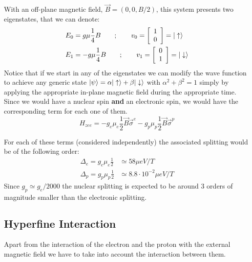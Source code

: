 With an off-plane magnetic field, $\vec{B}=(0,0,B/2)$, this system presents two eigenstates, that we can denote:
\begin{equation}
  \begin{split}
    E_0 &= g\mu\frac{1}{4}B \quad\quad;\quad\quad
    v_0 = \left[\begin{array}{c}
    1\\
    0
    \end{array}\right] = |\uparrow\rangle\\
    E_1 &= -g\mu\frac{1}{4}B \quad\quad;\quad\quad
    v_1 = \left[\begin{array}{c}
    0\\
    1
  \end{array}\right] = |\downarrow\rangle
  \end{split}
\end{equation}
Notice that if we start in any of the eigenstates we can modify the wave function to achieve any generic state $|\psi\rangle = \alpha|\uparrow\rangle+\beta|\downarrow\rangle$ with $\alpha^2+\beta^2 = 1$ simply by applying the appropriate in-plane magnetic field during the appropriate time.\\


Since we would have a nuclear spin \textbf{and} an electronic spin, we would have the corresponding term for each one of them.
\begin{equation}
  H_{zee} = -g_e\mu_e\frac{1}{2}\vec{B}\vec{\sigma}^e - g_p\mu_p\frac{1}{2}\vec{B}\vec{\sigma}^p
\end{equation}

For each of these terms (considered independently) the associated splitting would be of the following order:
\begin{equation}
  \begin{split}
    \Delta_e = g_e\mu_e\frac{1}{2} &\simeq 58 \mu eV/T \\
    \Delta_p = g_p\mu_p\frac{1}{2} &\simeq 8.8\cdot10^{-2}\mu eV/T
  \end{split}
\end{equation}
Since $g_p\simeq g_e/2000$ the nuclear splitting is expected to be around 3 orders of magnitude smaller than the electronic splitting.



\subsection{Hyperfine Interaction}
\label{sec:hyperfine}
Apart from the interaction of the electron and the proton with the external magnetic field we have to take into account the interaction between them.

